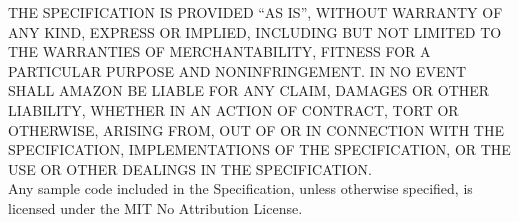 \noindent THE SPECIFICATION IS PROVIDED “AS IS”, WITHOUT WARRANTY OF ANY KIND,
EXPRESS OR IMPLIED, INCLUDING BUT NOT LIMITED TO THE WARRANTIES OF
MERCHANTABILITY, FITNESS FOR A PARTICULAR PURPOSE AND NONINFRINGEMENT. IN NO
EVENT SHALL AMAZON BE LIABLE FOR ANY CLAIM, DAMAGES OR OTHER LIABILITY, WHETHER
IN AN ACTION OF CONTRACT, TORT OR OTHERWISE, ARISING FROM, OUT OF OR IN
CONNECTION WITH THE SPECIFICATION, IMPLEMENTATIONS OF THE SPECIFICATION, OR THE
USE OR OTHER DEALINGS IN THE SPECIFICATION.\\

\noindent Any sample code included in the Specification, unless otherwise
specified, is licensed under the MIT No Attribution License.

\pagebreak